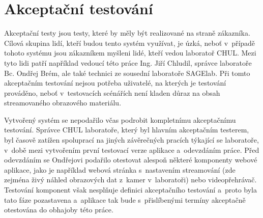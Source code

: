 \documentclass[thesis=M,czech]{FITthesis}[2012/06/26]
\begin{document}
\section{Akceptační testování} \label{sec:testovani_akceptacni}
Akceptační testy jsou testy, které by měly být realizované na straně zákazníka. Cílová skupina lidí, kteří budou tento systém využívat, je úzká, neboť v~případě tohoto systému jsou zákazníkem myšleni lidé, kteří vedou laboratoř CHUL. Mezi tyto lidi patří například vedoucí této práce Ing. Jiří Chludil, správce laboratoře Bc. Ondřej Brém, ale také technici ze sousední laboratoře SAGElab. Při tomto akceptačním testování nejsou potřeba uživatelé, na kterých je testování prováděno, neboť v~testovacích scénářích není kladen důraz na obsah streamovaného obrazového materiálu. 

	Vytvořený systém se nepodařilo včas podrobit kompletnímu akceptačnímu testování. Správce CHUL laboratoře, který byl hlavním akceptačním testerem, byl časově zatížen spoluprací na jiných závěrečných pracích týkající se laboratoře, v~době mezi vytvořením první testovací verze aplikace a~odevzdáním práce. Před odevzdáním se Ondřejovi podařilo otestovat alespoň některé komponenty webové aplikace, jako je například webová stránka s~nastavením streamování (zde zejména živý náhled obrazových dat z~kamer v~laboratoři) nebo videopřehrávač. Testování komponent však nesplňuje definici akceptačního testování a~proto byla tato fáze pozastavena a~aplikace tak bude s~přislíbenými termíny akceptačně otestována do obhajoby této práce.
		
\end{document}
